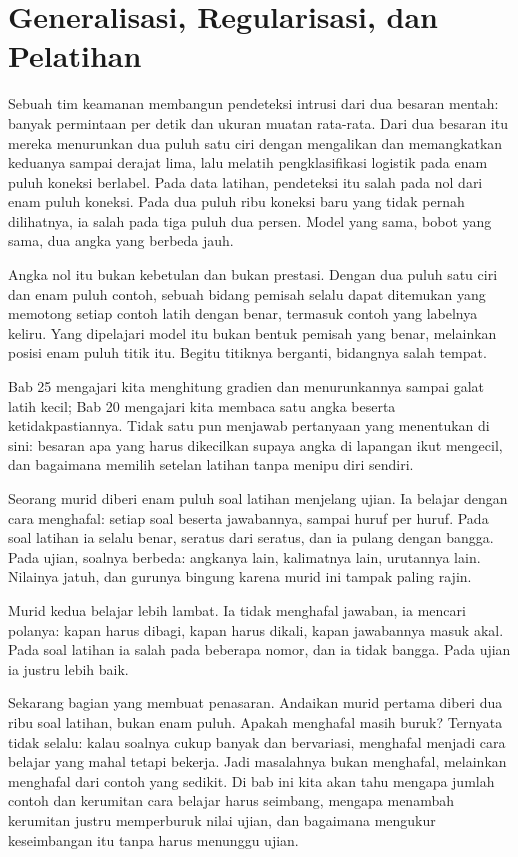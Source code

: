\chapter{Generalisasi, Regularisasi, dan Pelatihan}

Sebuah tim keamanan membangun pendeteksi intrusi dari dua besaran mentah: banyak
permintaan per detik dan ukuran muatan rata-rata. Dari dua besaran itu mereka
menurunkan dua puluh satu ciri dengan mengalikan dan memangkatkan keduanya sampai
derajat lima, lalu melatih pengklasifikasi logistik pada enam puluh koneksi berlabel.
Pada data latihan, pendeteksi itu salah pada nol dari enam puluh koneksi. Pada dua
puluh ribu koneksi baru yang tidak pernah dilihatnya, ia salah pada tiga puluh dua
persen. Model yang sama, bobot yang sama, dua angka yang berbeda jauh.

Angka nol itu bukan kebetulan dan bukan prestasi. Dengan dua puluh satu ciri dan enam
puluh contoh, sebuah bidang pemisah selalu dapat ditemukan yang memotong setiap contoh
latih dengan benar, termasuk contoh yang labelnya keliru. Yang dipelajari model itu
bukan bentuk pemisah yang benar, melainkan posisi enam puluh titik itu. Begitu titiknya
berganti, bidangnya salah tempat.

Bab 25 mengajari kita menghitung gradien dan menurunkannya sampai galat latih kecil;
Bab 20 mengajari kita membaca satu angka beserta ketidakpastiannya. Tidak satu pun
menjawab pertanyaan yang menentukan di sini: besaran apa yang harus dikecilkan supaya
angka di lapangan ikut mengecil, dan bagaimana memilih setelan latihan tanpa menipu diri
sendiri.

\begin{untukanak}
Seorang murid diberi enam puluh soal latihan menjelang ujian. Ia belajar dengan cara
menghafal: setiap soal beserta jawabannya, sampai huruf per huruf. Pada soal latihan ia
selalu benar, seratus dari seratus, dan ia pulang dengan bangga. Pada ujian, soalnya
berbeda: angkanya lain, kalimatnya lain, urutannya lain. Nilainya jatuh, dan gurunya
bingung karena murid ini tampak paling rajin.

Murid kedua belajar lebih lambat. Ia tidak menghafal jawaban, ia mencari polanya: kapan
harus dibagi, kapan harus dikali, kapan jawabannya masuk akal. Pada soal latihan ia
salah pada beberapa nomor, dan ia tidak bangga. Pada ujian ia justru lebih baik.

Sekarang bagian yang membuat penasaran. Andaikan murid pertama diberi dua ribu soal
latihan, bukan enam puluh. Apakah menghafal masih buruk? Ternyata tidak selalu: kalau
soalnya cukup banyak dan bervariasi, menghafal menjadi cara belajar yang mahal tetapi
bekerja. Jadi masalahnya bukan menghafal, melainkan menghafal dari contoh yang sedikit.
Di bab ini kita akan tahu mengapa jumlah contoh dan kerumitan cara belajar harus
seimbang, mengapa menambah kerumitan justru memperburuk nilai ujian, dan bagaimana
mengukur keseimbangan itu tanpa harus menunggu ujian.
\end{untukanak}

